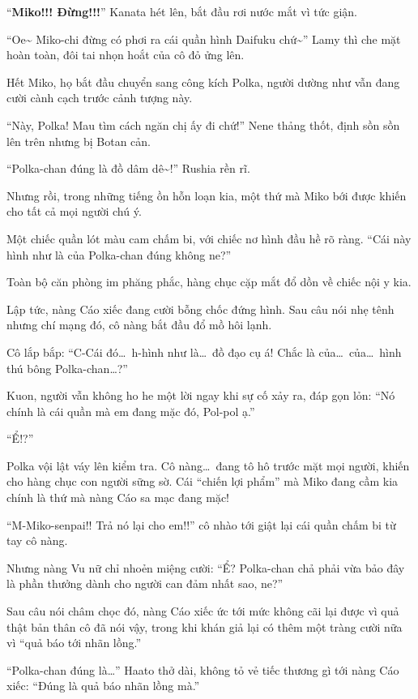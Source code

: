 \documentclass[../main.tex]{subfiles}
\begin{document}
``\textbf{Miko!!! Đừng!!!}'' Kanata hét lên, bắt đầu rơi nước mắt vì tức giận.

``Oe\~{} Miko-chi đừng có phơi ra cái quần hình Daifuku chứ\~{}'' Lamy thì che mặt hoàn toàn, đôi tai nhọn hoắt của cô đỏ ửng lên.

Hết Miko, họ bắt đầu chuyển sang công kích Polka, người dường như vẫn đang cười cành cạch trước cảnh tượng này.

``Này, Polka! Mau tìm cách ngăn chị ấy đi chứ!'' Nene thảng thốt, định sồn sồn lên trên nhưng bị Botan cản.

``Polka-chan đúng là đồ dâm dê\~{}!'' Rushia rền rĩ.

Nhưng rồi, trong những tiếng ồn hỗn loạn kia, một thứ mà Miko bới được khiến cho tất cả mọi người chú ý.

Một chiếc quần lót màu cam chấm bi, với chiếc nơ hình đầu hề rõ ràng. ``Cái này hình như là của Polka-chan đúng không ne?''

Toàn bộ căn phòng im phăng phắc, hàng chục cặp mắt đổ dồn về chiếc nội y kia.

Lập tức, nàng Cáo xiếc đang cười bỗng chốc đứng hình. Sau câu nói nhẹ tênh nhưng chí mạng đó, cô nàng bắt đầu đổ mồ hôi lạnh.

Cô lắp bắp: ``C-Cái đó\dots\ h-hình như là\dots\ đồ đạo cụ á! Chắc là của\dots\ của\dots\ hình thú bông Polka-chan\dots?''

Kuon, người vẫn không ho he một lời ngay khi sự cố xảy ra, đáp gọn lỏn: ``Nó chính là cái quần mà em đang mặc đó, Pol-pol ạ.''

``Ể!?''

Polka vội lật váy lên kiểm tra. Cô nàng\dots\ đang tô hô trước mặt mọi người, khiến cho hàng chục con người sững sờ. Cái ``chiến lợi phẩm'' mà Miko đang cầm kia chính là thứ mà nàng Cáo sa mạc đang mặc!

``M-Miko-senpai!! Trả nó lại cho em!!'' cô nhào tới giật lại cái quần chấm bi từ tay cô nàng.

Nhưng nàng Vu nữ chỉ nhoẻn miệng cười: ``Ể? Polka-chan chả phải vừa bảo đây là phần thưởng dành cho người can đảm nhất sao, ne?''

Sau câu nói châm chọc đó, nàng Cáo xiếc ức tới mức không cãi lại được vì quả thật bản thân cô đã nói vậy, trong khi khán giả lại có thêm một tràng cười nữa vì ``quả báo tới nhãn lồng.''

``Polka-chan đúng là\dots'' Haato thở dài, không tỏ vẻ tiếc thương gì tới nàng Cáo xiếc: ``Đúng là quả báo nhãn lồng mà.''
\end{document}
